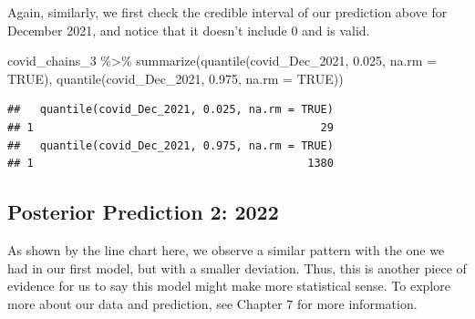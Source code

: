 \documentclass[
]{book}
\newenvironment{Shaded}{\begin{snugshade}}{\end{snugshade}}
\newcommand{\AttributeTok}[1]{\textcolor[rgb]{0.77,0.63,0.00}{#1}}
\newcommand{\ConstantTok}[1]{\textcolor[rgb]{0.00,0.00,0.00}{#1}}
\newcommand{\FloatTok}[1]{\textcolor[rgb]{0.00,0.00,0.81}{#1}}
\newcommand{\FunctionTok}[1]{\textcolor[rgb]{0.00,0.00,0.00}{#1}}
\newcommand{\NormalTok}[1]{#1}
\newcommand{\SpecialCharTok}[1]{\textcolor[rgb]{0.00,0.00,0.00}{#1}}
\begin{document}
Again, similarly, we first check the credible interval of our prediction above for December 2021, and notice that it doesn't include 0 and is valid.

\begin{Shaded}
\begin{Highlighting}[]
\NormalTok{covid\_chains\_3 }\SpecialCharTok{\%\textgreater{}\%}
  \FunctionTok{summarize}\NormalTok{(}\FunctionTok{quantile}\NormalTok{(covid\_Dec\_2021, }\FloatTok{0.025}\NormalTok{, }\AttributeTok{na.rm =} \ConstantTok{TRUE}\NormalTok{), }\FunctionTok{quantile}\NormalTok{(covid\_Dec\_2021, }\FloatTok{0.975}\NormalTok{, }\AttributeTok{na.rm =} \ConstantTok{TRUE}\NormalTok{))}
\end{Highlighting}
\end{Shaded}

\begin{verbatim}
##   quantile(covid_Dec_2021, 0.025, na.rm = TRUE)
## 1                                            29
##   quantile(covid_Dec_2021, 0.975, na.rm = TRUE)
## 1                                          1380
\end{verbatim}

\hypertarget{posterior-prediction-2-2022-1}{%
\subsection{Posterior Prediction 2: 2022}\label{posterior-prediction-2-2022-1}}

As shown by the line chart here, we observe a similar pattern with the one we had in our first model, but with a smaller deviation. Thus, this is another piece of evidence for us to say this model might make more statistical sense. To explore more about our data and prediction, see Chapter 7 for more information.
\end{document}
